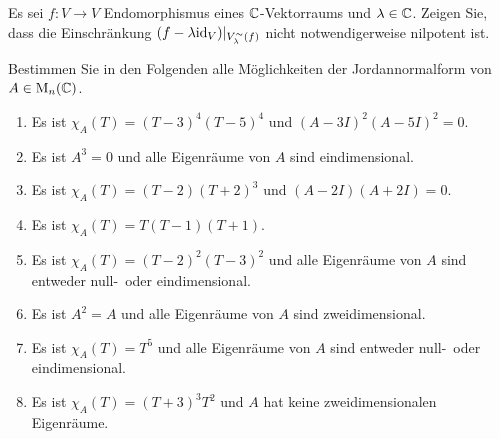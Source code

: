 \documentclass[a4paper,10pt]{scrartcl}
\begin{document}
\begin{question}
  Es sei $f \colon V \to V$ Endomorphismus eines $\mathbb{C}$-Vektorraums und $\lambda \in \mathbb{C}$.
  Zeigen Sie, dass die Einschränkung $(f - \lambda {\operatorname{id}_V})|_{V^\sim_\lambda(f)}$ nicht notwendigerweise nilpotent ist.
\end{question}


\begin{question}
  Bestimmen Sie in den Folgenden alle Möglichkeiten der Jordannormalform von $A \in \operatorname{M}_n(\mathbb{C})$.
  \begin{enumerate}[leftmargin=*]
    \item
     Es ist $\chi_A(T) = (T-3)^4 (T-5)^4$ und $(A - 3I)^2 (A - 5I)^2 = 0$.
    \item
      Es ist $A^3 = 0$ und alle Eigenräume von $A$ sind eindimensional.
    \item
      Es ist $\chi_A(T) = (T-2)(T+2)^3$ und $(A - 2I)(A + 2I) = 0$.
    \item
      Es ist $\chi_A(T) = T(T-1)(T+1)$.
    \item
      Es ist $\chi_A(T) = (T-2)^2(T-3)^2$ und alle Eigenräume von $A$ sind entweder null-\ oder eindimensional.
    \item
      Es ist $A^2 = A$ und alle Eigenräume von $A$ sind zweidimensional.
    \item
      Es ist $\chi_A(T) = T^5$ und alle Eigenräume von $A$ sind entweder null-\ oder eindimensional.
    \item
      Es ist $\chi_A(T) = (T+3)^3 T^2$ und $A$ hat keine zweidimensionalen Eigenräume.
  \end{enumerate}
\end{question}
\end{document}
